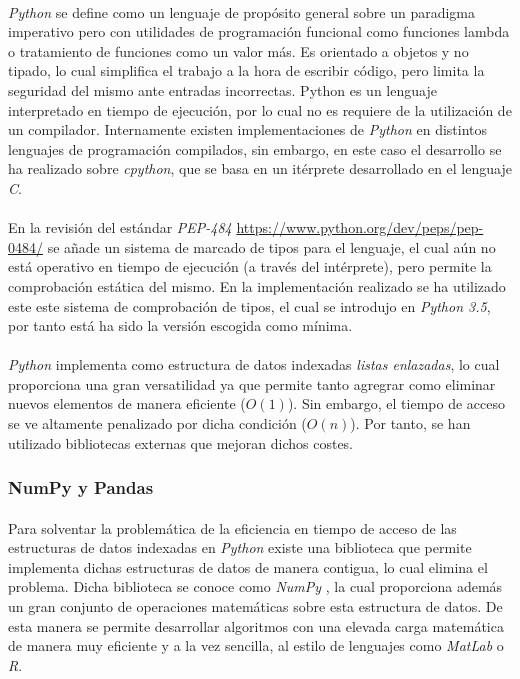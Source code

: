 \documentclass{subfiles}
\begin{document}
          \paragraph{}
          \emph{Python} se define como un lenguaje de propósito general sobre un paradigma imperativo pero con utilidades de programación funcional como funciones lambda o tratamiento de funciones como un valor más. Es orientado a objetos y no tipado, lo cual simplifica el trabajo a la hora de escribir código, pero limita la seguridad del mismo ante entradas incorrectas. Python es un lenguaje interpretado en tiempo de ejecución, por lo cual no es requiere de la utilización de un compilador. Internamente existen implementaciones de \emph{Python} en distintos lenguajes de programación compilados, sin embargo, en este caso el desarrollo se ha realizado sobre \emph{cpython}, que se basa en un itérprete desarrollado en el lenguaje \emph{C}.

          \paragraph{}
          En la revisión del estándar \emph{PEP-484} \url{https://www.python.org/dev/peps/pep-0484/} se añade un sistema de marcado de tipos para el lenguaje, el cual aún no está operativo en tiempo de ejecución (a través del intérprete), pero permite la comprobación estática del mismo. En la implementación realizado se ha utilizado este este sistema de comprobación de tipos, el cual se introdujo en \emph{Python 3.5}, por tanto está ha sido la versión escogida como mínima.

          \paragraph{}
          \emph{Python} implementa como estructura de datos indexadas \emph{listas enlazadas}, lo cual proporciona una gran versatilidad ya que permite tanto agregrar como eliminar nuevos elementos de manera eficiente ($O(1)$). Sin embargo, el tiempo de acceso se ve altamente penalizado por dicha condición ($O(n)$). Por tanto, se han utilizado bibliotecas externas que mejoran dichos costes.

        \subsubsection{NumPy y Pandas}
        \label{sec:numpy_pandas}

          \paragraph{}
          Para solventar la problemática de la eficiencia en tiempo de acceso de las estructuras de datos indexadas en \emph{Python} existe una biblioteca que permite implementa dichas estructuras de datos de manera contigua, lo cual elimina el problema. Dicha biblioteca se conoce como \emph{NumPy} \cite{walt2011numpy}, la cual proporciona además un gran conjunto de operaciones matemáticas sobre esta estructura de datos. De esta manera se permite desarrollar algoritmos con una elevada carga matemática de manera muy eficiente y a la vez sencilla, al estilo de lenguajes como \emph{MatLab} o \emph{R}.
\end{document}
